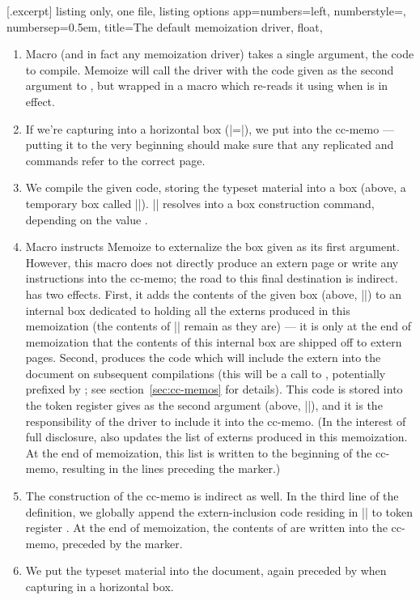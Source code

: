 \documentclass[a4paper,11pt]{article}
\begin{document}
[.excerpt]{%
  listing only, one file,
  listing options app={numbers=left, numberstyle=\tiny, numbersep=0.5em},
  title=The default memoization driver,
  float,
}

\begin{enumerate}
\item Macro  (and in fact any memoization
  driver) takes a single argument, the code to compile.  Memoize will call the
  driver with the code given as the second argument to , but
  wrapped in a macro which re-reads it using  when
   is in effect.
\item If we're capturing into a horizontal box
  (|=|), we put  into
  the cc-memo --- putting it to the very beginning should make sure that any
  replicated  and  commands refer to the correct page.
\item We compile the given code, storing the typeset material into a box
  (above, a temporary box called |\mmz@box|).  |\mmz@capture| resolves into a
  box construction command, depending on the value .
\item Macro  instructs Memoize to externalize the box
  given as its first argument.  However, this macro does not directly produce
  an extern page or write any instructions into the cc-memo; the road to this
  final destination is indirect.   has two effects.
  First, it adds the contents of the given box (above, |\mmz@box|) to an
  internal box dedicated to holding all the externs produced in this
  memoization (the contents of |\mmz@box| remain as they are) --- it is only at
  the end of memoization that the contents of this internal box are shipped off
  to extern pages.  Second,  produces the code which
  will include the extern into the document on subsequent compilations (this
  will be a call to , potentially prefixed by
  ; see section~\ref{sec:cc-memos} for details).  This code
  is stored into the token register gives as the second argument (above,
  |\mmz@temptoks|), and it is the responsibility of the driver to include it
  into the cc-memo.  (In the interest of full disclosure,
   also updates the list of externs produced in this
  memoization.  At the end of memoization, this list is written to the
  beginning of the cc-memo, resulting in the  lines
  preceding the  marker.)
\item The construction of the cc-memo is indirect as well.  In the third line
  of the definition, we globally append the extern-inclusion code residing in
  |\mmz@temptoks| to token register .  At the end of
  memoization, the contents of  are written into the cc-memo,
  preceded by the  marker.
\item We put the typeset material into the document, again preceded by
   when capturing in a horizontal box.
\end{enumerate}
\end{document}
